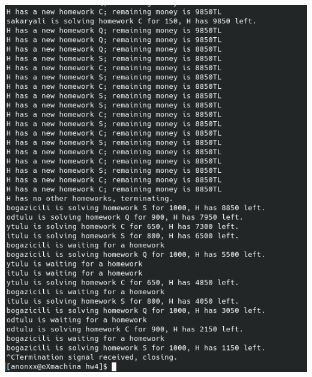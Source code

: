 \documentclass{report}
\begin{document}
\includegraphics[width=\textwidth,height=\textheight,keepaspectratio]{images/termination.png}\\
\end{document}
